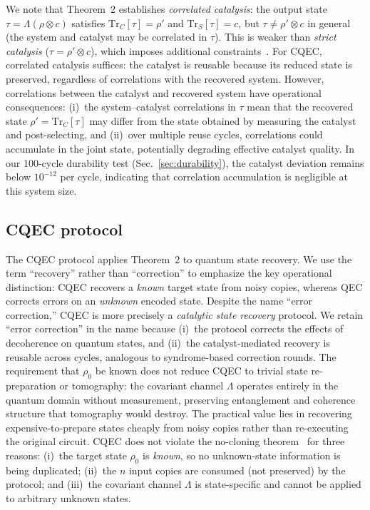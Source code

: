 \documentclass[prx,twocolumn,superscriptaddress,longbibliography,floatfix]{revtex4-2}
\begin{document}
We note that Theorem~2 establishes \emph{correlated catalysis}: the output state $\tau = \Lambda(\rho \otimes c)$ satisfies $\mathrm{Tr}_C[\tau] = \rho'$ and $\mathrm{Tr}_S[\tau] = c$, but $\tau \neq \rho' \otimes c$ in general (the system and catalyst may be correlated in $\tau$).
This is weaker than \emph{strict catalysis} ($\tau = \rho' \otimes c$), which imposes additional constraints~\cite{Shiraishi2024}.
For CQEC, correlated catalysis suffices: the catalyst is reusable because its reduced state is preserved, regardless of correlations with the recovered system.
However, correlations between the catalyst and recovered system have operational consequences: (i)~the system--catalyst correlations in $\tau$ mean that the recovered state $\rho' = \mathrm{Tr}_C[\tau]$ may differ from the state obtained by measuring the catalyst and post-selecting, and (ii)~over multiple reuse cycles, correlations could accumulate in the joint state, potentially degrading effective catalyst quality.
In our 100-cycle durability test (Sec.~\ref{sec:durability}), the catalyst deviation remains below $10^{-12}$ per cycle, indicating that correlation accumulation is negligible at this system size.


\subsection{CQEC protocol}
\label{sec:cqec_protocol}

The CQEC protocol applies Theorem~2 to quantum state recovery.
We use the term ``recovery'' rather than ``correction'' to emphasize the key operational distinction: CQEC recovers a \emph{known} target state from noisy copies, whereas QEC corrects errors on an \emph{unknown} encoded state.
Despite the name ``error correction,'' CQEC is more precisely a \emph{catalytic state recovery} protocol.
We retain ``error correction'' in the name because (i)~the protocol corrects the effects of decoherence on quantum states, and (ii)~the catalyst-mediated recovery is reusable across cycles, analogous to syndrome-based correction rounds.
The requirement that $\rho_0$ be known does not reduce CQEC to trivial state re-preparation or tomography: the covariant channel $\Lambda$ operates entirely in the quantum domain without measurement, preserving entanglement and coherence structure that tomography would destroy.
The practical value lies in recovering expensive-to-prepare states cheaply from noisy copies rather than re-executing the original circuit.
CQEC does not violate the no-cloning theorem~\cite{Wootters1982} for three reasons: (i)~the target state $\rho_0$ is \emph{known}, so no unknown-state information is being duplicated; (ii)~the $n$ input copies are consumed (not preserved) by the protocol; and (iii)~the covariant channel $\Lambda$ is state-specific and cannot be applied to arbitrary unknown states.
\end{document}
